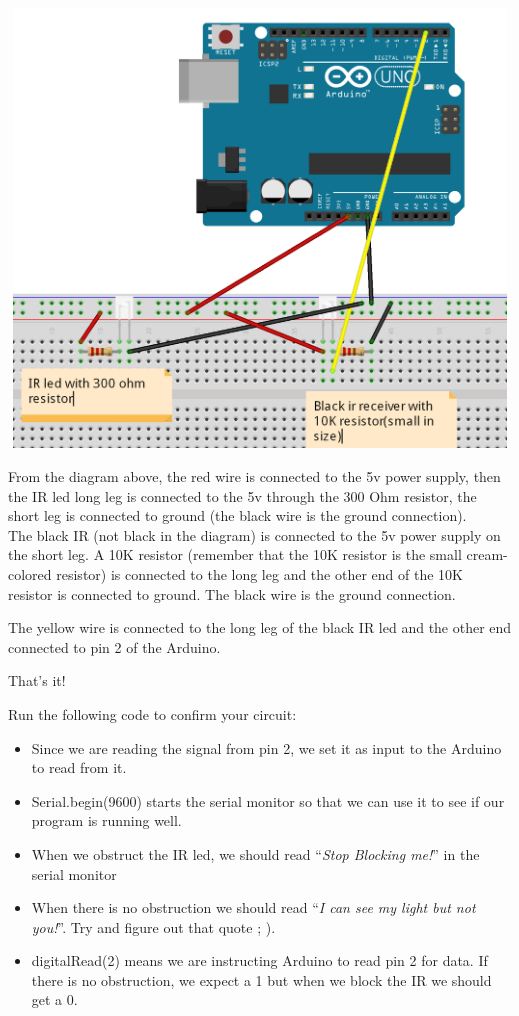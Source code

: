 \documentclass[14pt, oneside]{memoir}
\begin{document}
\includegraphics[width=7.06667in,height=4.58788in]{circuit_images/ir_circuit.png}

From the diagram above, the red wire is connected to the 5v power
supply, 
then the IR led long leg is connected to the 5v through the 300
Ohm
resistor, the short leg is connected to ground (the black wire is the
ground connection).
\\
The black IR (not black in the diagram) is connected to the 5v power
supply on the short leg. A 10K resistor (remember that the 10K resistor
is the small cream-colored resistor) is connected to the long leg and
the other end of the 10K resistor is connected to ground. The black wire
is the ground connection.

The yellow wire is connected to the long leg of the black IR led and the
other end connected to pin 2 of the Arduino.

That's it!

Run the following code to confirm your circuit:




\begin{itemize}
    \item Since we are reading the signal from pin 2, we set it as
        input to the Arduino to read from it.
    \item Serial.begin(9600) starts the serial monitor so that we
        can use it to see if our program is running well.
    \item When we obstruct the IR led, we should read ``\emph{Stop
        Blocking me!}'' in the serial monitor
    \item When there is no obstruction we should read ``\emph{I
        can see my light but not you!}''. Try and figure out that quote ; ).
    \item digitalRead(2) means we are instructing Arduino to read
        pin 2 for data. If there is no obstruction, we expect a 1
        but when we block the IR we should get a 0.
\end{itemize}
\end{document}
